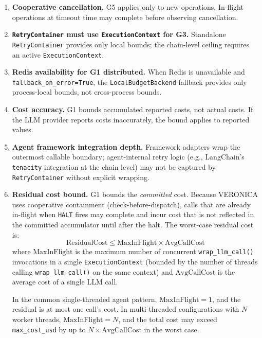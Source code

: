 \documentclass[11pt]{article}
\begin{document}
\begin{enumerate}
  \item \textbf{Cooperative cancellation.} G5 applies only to new operations.
    In-flight operations at timeout time may complete before observing
    cancellation.

  \item \textbf{\texttt{RetryContainer} must use \texttt{ExecutionContext} for
    G3.} Standalone \texttt{RetryContainer} provides only local bounds; the
    chain-level ceiling requires an active \texttt{ExecutionContext}.

  \item \textbf{Redis availability for G1 distributed.} When Redis is
    unavailable and \texttt{fallback\_on\_error=True}, the
    \texttt{LocalBudgetBackend} fallback provides only process-local bounds,
    not cross-process bounds.

  \item \textbf{Cost accuracy.} G1 bounds accumulated reported costs, not
    actual costs. If the LLM provider reports costs inaccurately, the bound
    applies to reported values.

  \item \textbf{Agent framework integration depth.} Framework adapters wrap
    the outermost callable boundary; agent-internal retry logic (e.g.,
    LangChain's \texttt{tenacity} integration at the chain level) may not be
    captured by \texttt{RetryContainer} without explicit wrapping.

  \item \textbf{Residual cost bound.} G1 bounds the \emph{committed} cost.
    Because VERONICA uses cooperative containment (check-before-dispatch),
    calls that are already in-flight when \texttt{HALT} fires may complete and
    incur cost that is not reflected in the committed accumulator until after
    the halt. The worst-case residual cost is:
    \[
      \text{ResidualCost} \leq \text{MaxInFlight} \times \text{AvgCallCost}
    \]
    where $\text{MaxInFlight}$ is the maximum number of concurrent
    \texttt{wrap\_llm\_call()} invocations in a single
    \texttt{ExecutionContext} (bounded by the number of threads calling
    \texttt{wrap\_llm\_call()} on the same context) and $\text{AvgCallCost}$
    is the average cost of a single LLM call.

    In the common single-threaded agent pattern, $\text{MaxInFlight} = 1$,
    and the residual is at most one call's cost. In multi-threaded
    configurations with $N$ worker threads, $\text{MaxInFlight} = N$, and the
    total cost may exceed \texttt{max\_cost\_usd} by up to
    $N \times \text{AvgCallCost}$ in the worst case.


\end{enumerate}
\end{document}
